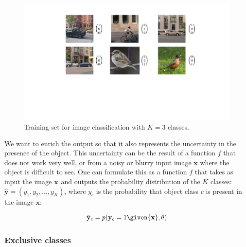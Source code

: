 \begin{figure}
    \centerline{
        \includegraphics[width=1\linewidth]{figures/object_recognition/classification_training_set.pdf}
    }
    \caption{Training set for image classification with $K=3$ classes.}
    \label{fig:classification_training_set}
\end{figure}

We want to enrich the output so that it also represents the uncertainty in the presence of the object. This uncertainty can be the result of a function $f$ that does not work very well, or from a noisy or blurry input image $\mathbf{x}$ where the object is difficult to see. One can formulate this as a function $f$ that takes as input the image ${\bf x}$ and outputs the probability distribution of the $K$ classes: $\hat{\mathbf{y}}=(y_1, y_2, ..., y_K)$, where $y_c$ is the probability that object class $c$ is present in the image $\mathbf{x}$:

\begin{equation}
    \hat {\bf y}_c = p({\bf y}_c=1 \given {\bf x}, \theta)
\end{equation}

\subsubsection{Exclusive classes}

